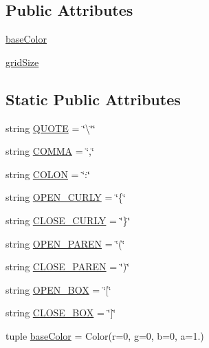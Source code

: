 \subsection*{Public Attributes}
\begin{DoxyCompactItemize}
\item 
\hyperlink{class_bridges_1_1color__grid_1_1_color_grid_a97e66f3c97bbf57c2aa2f5fb78c4114f}{base\+Color}
\item 
\hyperlink{class_bridges_1_1color__grid_1_1_color_grid_aabd8053e5acb920c28e519cd1ee69c35}{grid\+Size}
\end{DoxyCompactItemize}
\subsection*{Static Public Attributes}
\begin{DoxyCompactItemize}
\item 
string \hyperlink{class_bridges_1_1color__grid_1_1_color_grid_a1db881c79ab55a95c4c15dee31a1e431}{Q\+U\+O\+T\+E} = \char`\"{}\textbackslash{}\char`\"{}\char`\"{}
\item 
string \hyperlink{class_bridges_1_1color__grid_1_1_color_grid_af280f63885bffee3d3b6ecf0695844fc}{C\+O\+M\+M\+A} = \char`\"{},\char`\"{}
\item 
string \hyperlink{class_bridges_1_1color__grid_1_1_color_grid_a6185e36f338b56b33ff327afda157cf1}{C\+O\+L\+O\+N} = \char`\"{}\+:\char`\"{}
\item 
string \hyperlink{class_bridges_1_1color__grid_1_1_color_grid_a1f379a6c0e9fc4db2045e52678f15e20}{O\+P\+E\+N\+\_\+\+C\+U\+R\+L\+Y} = \char`\"{}\{\char`\"{}
\item 
string \hyperlink{class_bridges_1_1color__grid_1_1_color_grid_a05c0cee0f9ca312db59a1d60e53845ba}{C\+L\+O\+S\+E\+\_\+\+C\+U\+R\+L\+Y} = \char`\"{}\}\char`\"{}
\item 
string \hyperlink{class_bridges_1_1color__grid_1_1_color_grid_abde748d9ceae5339a3724b7064eee054}{O\+P\+E\+N\+\_\+\+P\+A\+R\+E\+N} = \char`\"{}(\char`\"{}
\item 
string \hyperlink{class_bridges_1_1color__grid_1_1_color_grid_afed081c42ad44319664d72567ee1b9ba}{C\+L\+O\+S\+E\+\_\+\+P\+A\+R\+E\+N} = \char`\"{})\char`\"{}
\item 
string \hyperlink{class_bridges_1_1color__grid_1_1_color_grid_a33869db1b3658c232827a2a0bc6e7170}{O\+P\+E\+N\+\_\+\+B\+O\+X} = \char`\"{}\mbox{[}\char`\"{}
\item 
string \hyperlink{class_bridges_1_1color__grid_1_1_color_grid_a9dcd6e3ce6c70a78216615edb35ec00e}{C\+L\+O\+S\+E\+\_\+\+B\+O\+X} = \char`\"{}\mbox{]}\char`\"{}
\item 
tuple \hyperlink{class_bridges_1_1color__grid_1_1_color_grid_a0bfaf5f4bdcf43899b67badca669e806}{base\+Color} = Color(r=0, g=0, b=0, a=1.)
\end{DoxyCompactItemize}


